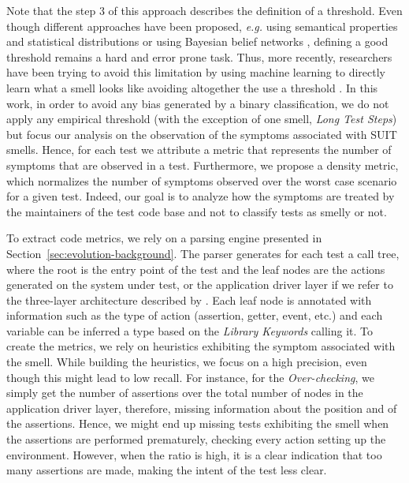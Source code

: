 Note that the step 3 of this approach describes the definition of a threshold. Even though different approaches have been proposed, \emph{e.g.} using semantical properties and statistical distributions \cite{Marinescu2004} or using Bayesian belief networks \cite{Khomh2009}, defining a good threshold remains a hard and error prone task. Thus, more recently, researchers have been trying to avoid this limitation by using machine learning to directly learn what a smell looks like avoiding altogether the use a threshold \cite{ArcelliFontana2016}. In this work, in order to avoid any bias generated by a binary classification, we do not apply any empirical threshold (with the exception of one smell, \emph{Long Test Steps}) but focus our analysis on the observation of the symptoms associated with SUIT smells. Hence, for each test we attribute a metric that represents the number of symptoms that are observed in a test. Furthermore, we propose a density metric, which normalizes the number of symptoms observed over the worst case scenario for a given test. Indeed, our goal is to analyze how the symptoms are treated by the maintainers of the test code base and not to classify tests as smelly or not.

To extract code metrics, we rely on a parsing engine presented in Section~\ref{sec:evolution-background}. The parser generates for each test a call tree, where the root is the entry point of the test and the leaf nodes are the actions generated on the system under test, or the application driver layer if we refer to the three-layer architecture described by \textcite{Humble2010}. Each leaf node is annotated with information such as the type of action (assertion, getter, event, etc.) and each variable can be inferred a type based on the \emph{Library Keywords} calling it. 
To create the metrics, we rely on heuristics exhibiting the symptom associated with the smell. While building the heuristics, we focus on a high precision, even though this might lead to low recall. 
For instance, for the \emph{Over-checking}, we simply get the number of assertions over the total number of nodes in the application driver layer, therefore, missing information about the position and of the assertions. Hence, we might end up missing tests exhibiting the smell when the assertions are performed prematurely, checking every action setting up the environment. However, when the ratio is high, it is a clear indication that too many assertions are made, making the intent of the test less clear.

